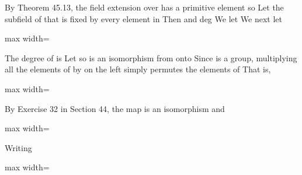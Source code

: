 \documentclass[11pt,oneside]{article}
\begin{document}
\begin{BookBody}
By Theorem 45.13, the field extension  over  has a primitive element\BookInline{,\allowbreak \alpha,\allowbreak } so  Let  the subfield of  that is fixed by every element in  Then  and \BookInline{[K:E]= } deg We let  We next let

\begin{center}\begin{adjustbox}{max width=\linewidth}\end{adjustbox}\end{center}

\noindent The degree of  is  Let  so \BookInline{\tau } is an isomorphism from  onto  Since  is a group, multiplying all the elements of  by \BookInline{\tau } on the left simply permutes the elements of  That is,

\begin{center}\begin{adjustbox}{max width=\linewidth}\end{adjustbox}\end{center}

\noindent By Exercise 32 in Section 44, the map  is an isomorphism and

\begin{center}\begin{adjustbox}{max width=\linewidth}\end{adjustbox}\end{center}

\noindent Writing 

\begin{center}\begin{adjustbox}{max width=\linewidth}\end{adjustbox}\end{center}


\end{BookBody}
\end{document}
